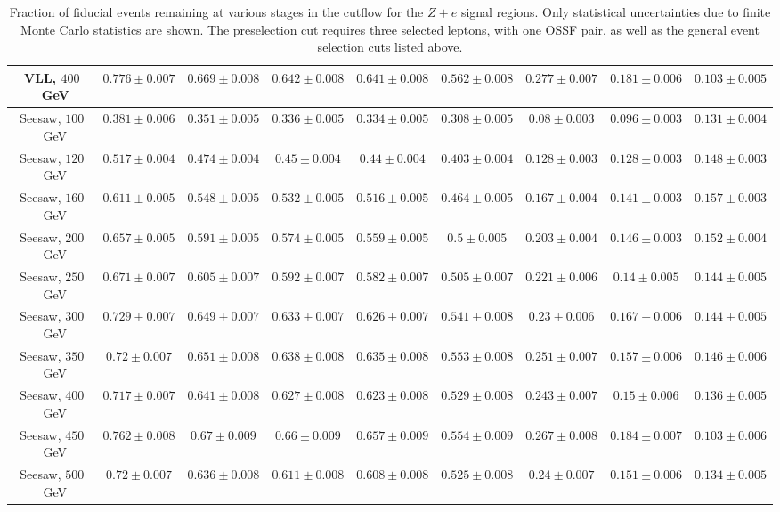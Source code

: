 \begin{table}[ht]
{\begin{tabular}{|c|c|c|c|c|c||c|c|c|}
		\hline
		VLL, $400$~GeV		&	$0.776 \pm 0.007$	&	$0.669 \pm 0.008$	&	$0.642 \pm 0.008$	&	$0.641 \pm 0.008$	&	$0.562 \pm 0.008$	&	$0.277 \pm 0.007$ &	$0.181 \pm 0.006$	&	$0.103 \pm 0.005$	\\
		\hline
		Seesaw, $100$~GeV	&	$0.381 \pm 0.006$	&	$0.351 \pm 0.005$	&	$0.336 \pm 0.005$	&	$0.334 \pm 0.005$	&	$0.308 \pm 0.005$	&	$0.08 \pm 0.003$ &	$0.096 \pm 0.003$	&	$0.131 \pm 0.004$	\\
		\hline
		Seesaw, $120$~GeV	&	$0.517 \pm 0.004$	&	$0.474 \pm 0.004$	&	$0.45 \pm 0.004$	&	$0.44 \pm 0.004$	&	$0.403 \pm 0.004$	&	$0.128 \pm 0.003$ &	$0.128 \pm 0.003$	&	$0.148 \pm 0.003$	\\
		\hline
		Seesaw, $160$~GeV	&	$0.611 \pm 0.005$	&	$0.548 \pm 0.005$	&	$0.532 \pm 0.005$	&	$0.516 \pm 0.005$	&	$0.464 \pm 0.005$	&	$0.167 \pm 0.004$ &	$0.141 \pm 0.003$	&	$0.157 \pm 0.003$	\\
		\hline
		Seesaw, $200$~GeV	&	$0.657 \pm 0.005$	&	$0.591 \pm 0.005$	&	$0.574 \pm 0.005$	&	$0.559 \pm 0.005$	&	$0.5 \pm 0.005$		&	$0.203 \pm 0.004$ &	$0.146 \pm 0.003$	&	$0.152 \pm 0.004$	\\
		\hline
		Seesaw, $250$~GeV	&	$0.671 \pm 0.007$	&	$0.605 \pm 0.007$	&	$0.592 \pm 0.007$	&	$0.582 \pm 0.007$	&	$0.505 \pm 0.007$	&	$0.221 \pm 0.006$ &	$0.14 \pm 0.005$	&	$0.144 \pm 0.005$	\\
		\hline
		Seesaw, $300$~GeV	&	$0.729 \pm 0.007$	&	$0.649 \pm 0.007$	&	$0.633 \pm 0.007$	&	$0.626 \pm 0.007$	&	$0.541 \pm 0.008$	&	$0.23 \pm 0.006$ &	$0.167 \pm 0.006$	&	$0.144 \pm 0.005$	\\
		\hline
		Seesaw, $350$~GeV	&	$0.72 \pm 0.007$	&	$0.651 \pm 0.008$	&	$0.638 \pm 0.008$	&	$0.635 \pm 0.008$	&	$0.553 \pm 0.008$	&	$0.251 \pm 0.007$ &	$0.157 \pm 0.006$	&	$0.146 \pm 0.006$	\\
		\hline
		Seesaw, $400$~GeV	&	$0.717 \pm 0.007$	&	$0.641 \pm 0.008$	&	$0.627 \pm 0.008$	&	$0.623 \pm 0.008$	&	$0.529 \pm 0.008$	&	$0.243 \pm 0.007$ &	$0.15 \pm 0.006$	&	$0.136 \pm 0.005$	\\
		\hline
		Seesaw, $450$~GeV	&	$0.762 \pm 0.008$	&	$0.67 \pm 0.009$	&	$0.66 \pm 0.009$	&	$0.657 \pm 0.009$	&	$0.554 \pm 0.009$	&	$0.267 \pm 0.008$ &	$0.184 \pm 0.007$	&	$0.103 \pm 0.006$	\\
		\hline
		Seesaw, $500$~GeV	&	$0.72 \pm 0.007$	&	$0.636 \pm 0.008$	&	$0.611 \pm 0.008$	&	$0.608 \pm 0.008$	&	$0.525 \pm 0.008$	&	$0.24 \pm 0.007$ &	$0.151 \pm 0.006$	&	$0.134 \pm 0.005$	\\
		\hline
	\end{tabular}
	}
	\caption{Fraction of fiducial events remaining at various stages in the cutflow for the $Z+e$ signal regions. Only statistical uncertainties due to finite Monte Carlo statistics are shown. The preselection cut requires three selected leptons, with one OSSF pair, as well as the general event selection cuts listed above.}
	\label{table:fiducial-efficiencies-Ze}
\end{table}

